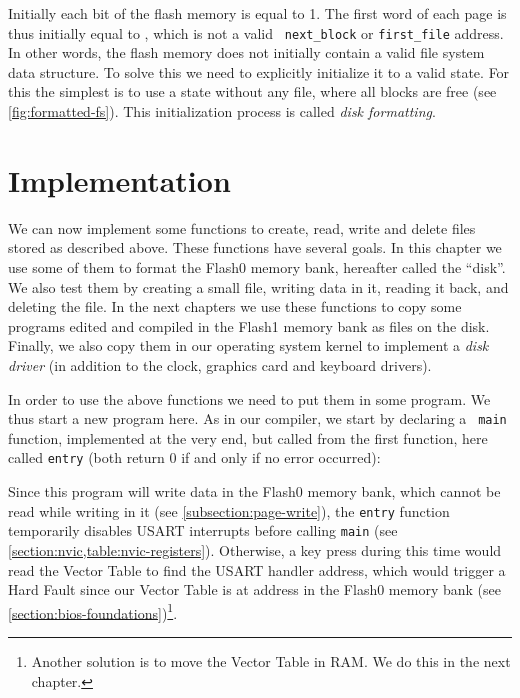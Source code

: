 Initially each bit of the flash memory is equal to 1. The first word of each
page is thus initially equal to , which is not a valid {\tt
next\_block} or {\tt first\_file} address. In other words, the flash memory does
not initially contain a valid file system data structure. To solve this we need
to explicitly initialize it to a valid state. For this the simplest is to use a
state without any file, where all blocks are free (see
\cref{fig:formatted-fs}). This initialization process is called {\em disk
formatting}.

\section{Implementation}


We can now implement some functions to create, read, write and delete files
stored as described above. These functions have several goals. In this chapter
we use some of them to format the Flash0 memory bank, hereafter called the
``disk''. We also test them by creating a small file, writing data in it,
reading it back, and deleting the file. In the next chapters we use these
functions to copy some programs edited and compiled in the Flash1 memory bank
as files on the disk. Finally, we also copy them in our operating system kernel
to implement a {\em disk driver} (in addition to the clock, graphics card and
keyboard drivers).

In order to use the above functions we need to put them in some program. We
thus start a new program here. As in our compiler, we start by declaring a {\tt
main} function, implemented at the very end, but called from the first
function, here called {\tt entry} (both return 0 if and only if no error
occurred):


Since this program will write data in the Flash0 memory bank, which cannot be
read while writing in it (see \cref{subsection:page-write}), the {\tt entry}
function temporarily disables USART interrupts before calling {\tt main} (see
\cref{section:nvic,table:nvic-registers}). Otherwise, a key press during this
time would read the Vector Table to find the USART handler address, which would
trigger a Hard Fault since our Vector Table is at address  in the
Flash0 memory bank (see \cref{section:bios-foundations})\footnote{Another
solution is to move the Vector Table in RAM. We do this in the next chapter.}.

